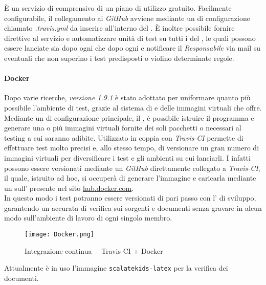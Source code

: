 \documentclass{scalatekids-article}
\begin{document}
È un servizio di  comprensivo di un piano di
utilizzo gratuito. Facilmente configurabile, il collegamento ai 
\textit{GitHub} avviene mediante un  di configurazione chiamato \textit{.travis.yml}
da inserire all'interno del . È inoltre possibile fornire
direttive al servizio e automatizzare unità di test su tutti i  del
, le quali possono essere lanciate sia dopo ogni 
che dopo ogni  e notificare il \textit{Responsabile} via mail su
eventuali  che non superino i test predisposti o violino
determinate regole.

\paragraph{Docker}

Dopo varie ricerche, \textit{ versione 1.9.1} è stato adottato per uniformare quanto più
possibile l'ambiente di test, grazie al sistema di  e
 delle immagini virtuali che offre.\\ Mediante un  di
configurazione principale, il , è possibile istruire il
programma e generare una o più immagini virtuali fornite dei soli pacchetti o
 necessari al testing a cui saranno adibite. Utilizzato in coppia con
\textit{Travis-CI} permette di effettuare test molto precisi e, allo stesso
tempo, di versionare un gran numero di immagini virtuali per diversificare i test e
gli ambienti su cui lanciarli. I  infatti possono essere
versionati mediante un  \textit{GitHub} direttamente collegato a
\textit{Travis-CI}, il quale, istruito ad hoc, si occuperà di generare
l'immagine  e caricarla mediante un  sull'
 presente nel sito \url{hub.docker.com}.\\ In questo modo i test
potranno essere versionati di pari passo con l' di sviluppo, garantendo
un accurata  di verifica sui sorgenti e documenti senza gravare in alcun
modo sull'ambiente di lavoro di ogni singolo membro.
\begin{figure}[H]
  \centering
  \texttt{[image: Docker.png]}
  \caption{Integrazione continua\ -\ Travis-CI + Docker}
\end{figure}
Attualmente è in uso l'immagine \verb=scalatekids-latex= per la verifica dei documenti.
\end{document}
